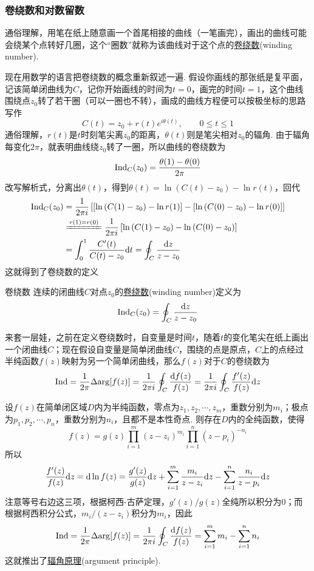 \documentclass[main.tex]{subfiles}
\begin{document}
\subsubsection{卷绕数和对数留数}

通俗理解，用笔在纸上随意画一个首尾相接的曲线（一笔画完），画出的曲线可能会绕某个点转好几圈，这个“圈数”就称为该曲线对于这个点的\uline{卷绕数}(winding number).

现在用数学的语言把卷绕数的概念重新叙述一遍. 假设你画线的那张纸是复平面，记该简单闭曲线为\(C\)，记你开始画线的时间为\(t=0\)，画完的时间\(t=1\)，这个曲线围绕点\(z_0\)转了若干圈（可以一圈也不转），画成的曲线方程便可以按极坐标的思路写作
\[C(t) = z_0 + r(t)e^{i\theta(t)}, \qquad 0 \leq t \leq 1\]
通俗理解，\(r(t)\)是\(t\)时刻笔尖离\(z_0\)的距离，\(\theta(t)\)则是笔尖相对\(z_0\)的辐角. 由于辐角每变化\(2\pi\)，就表明曲线绕\(z_0\)转了一圈，所以曲线的卷绕数为
\[ {\rm Ind}_C(z_0) = \frac{\theta(1)-\theta(0)}{2\pi} \]
改写解析式，分离出\(\theta(t)\)，得到\(\theta(t) = \ln \left(C(t) - z_0\right) - \ln r(t)\)，回代
\begin{align*}
    \trm{Ind}_C(z_0) &= \frac{1}{2\pi i}\left[\left[\ln \left(C(1) - z_0\right) - \ln r(1)\right]-\left[\ln \left(C(0) - z_0\right) - \ln r(0)\right]\right] \\
    & \xlongequal[]{r(1)=r(0)} \frac{1}{2\pi i}\left[\ln \left(C(1) - z_0\right)-\ln \left(C(0) - z_0\right)\right] \\
    & = \int_{0}^{1} \frac{C'(t)}{C(t)-z_0} \trm{d}t = \oint_{C}\frac{\trm{d}z}{z-z_0}
\end{align*}
这就得到了卷绕数的定义
\begin{definition}{卷绕数}
    连续的闭曲线\(C\)对点\(z_0\)的\uline{卷绕数}(winding number)定义为
    \[{\rm Ind}_C(z_0) = \oint_{C}\frac{{\rm d}z}{z-z_0}\]
\end{definition}

来套一层娃，之前在定义卷绕数时，自变量是时间\(t\)，随着\(t\)的变化笔尖在纸上画出一个闭曲线\(C\)；现在假设自变量是简单闭曲线\(C\)，围绕的点是原点，\(C\)上的点经过半纯函数\(f(z)\)映射为另一个简单闭曲线，那么\(f(z)\)对于\(C\)的卷绕数为
\[{\rm Ind} = \frac{1}{2\pi}\Delta{\rm arg} [f(z)] = \frac{1}{2\pi i}\oint_{C}\frac{{\rm d}f(z)}{f(z)} = \frac{1}{2\pi i}\oint_{C}\frac{f'(z)}{f(z)}{\rm d}z\]

设\(f(z)\)在简单闭区域\(D\)内为半纯函数，零点为\(z_1,z_2,\cdots,z_m\)，重数分别为\(m_i\)；极点为\(p_1, p_2, \cdots, p_n\)，重数分别为\(n_i\)，且都不是本性奇点. 则存在\(D\)内的全纯函数，使得
\[f(z) = g(z)\prod_{i=1}^{m}(z-z_i)^{m_i}\prod_{i=1}^{n}(z-p_i)^{-n_i}\]
所以
\[\frac{f'(z)}{f(z)}{\rm d}z = {\rm d}\ln f(z) = \frac{g'(z)}{g(z)}{\rm d}z + \sum_{i=1}^{m}\frac{m_i}{z-z_i}{\rm d}z - \sum_{i=1}^{n} \frac{n_i}{z-p_i} {\rm d}z\]
注意等号右边这三项，根据柯西-古萨定理，\(g'(z)/g(z)\)全纯所以积分为\(0\)；而根据柯西积分公式，\(m_i/(z-z_i)\)积分为\(m_i\)，因此
\[{\rm Ind} = \frac{1}{2\pi}\Delta{\rm arg} [f(z)] = \frac{1}{2\pi i}\oint_{C}\frac{{\rm d}f(z)}{f(z)} = \sum_{i=1}^{m}m_i - \sum_{i=1}^{n}n_i\]
这就推出了\uline{辐角原理}(argument principle).
\end{document}

